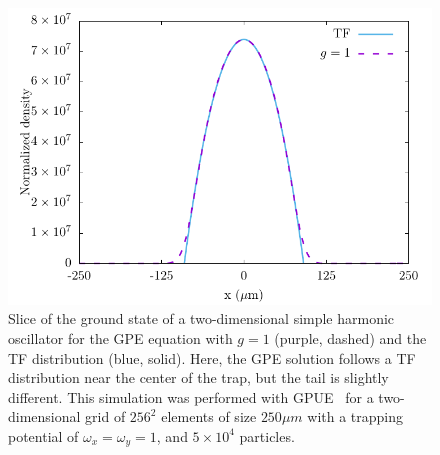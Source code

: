 \begin{figure}
\center \includegraphics[width = \textwidth]{data/qs/SHO/SHO.pdf}

\caption{Slice of the ground state of a two-dimensional simple harmonic oscillator for the GPE equation with $g=1$ (purple, dashed) and the TF distribution (blue, solid).
Here, the GPE solution follows a TF distribution near the center of the trap, but the tail is slightly different.
This simulation was performed with GPUE~\cite{schloss2018} for a two-dimensional grid of $256^2$ elements of size $250 \mu m$ with a trapping potential of $\omega_x = \omega_y = 1$, and $5\times 10^4$ particles.}
\label{fig:TF}
\end{figure}


